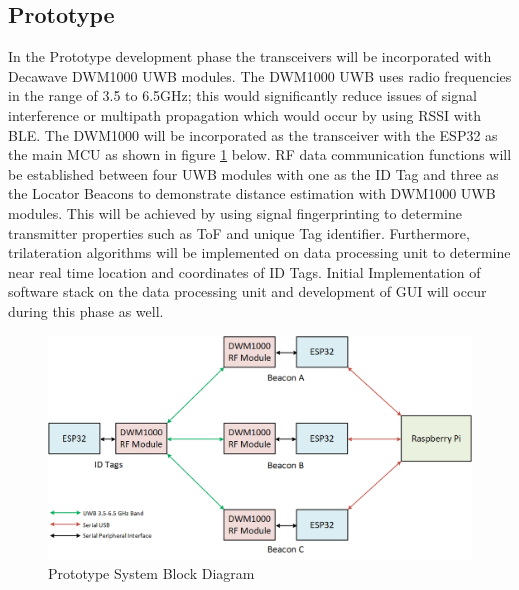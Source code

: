 \pagebreak
\subsection{Prototype}
\medskip
In the Prototype development phase the transceivers will be incorporated with Decawave DWM1000 UWB modules. The DWM1000 UWB uses radio frequencies in the range of 3.5 to 6.5GHz; this would significantly reduce issues of signal interference or multipath propagation which would occur by using RSSI with BLE. The DWM1000 will be incorporated as the transceiver with the ESP32 as the main MCU as shown in figure \ref{prototype} below. RF data communication functions will be established between four UWB modules with one as the ID Tag and three as the Locator Beacons to demonstrate distance estimation with DWM1000 UWB modules. This will be achieved by using signal fingerprinting to determine transmitter properties such as ToF and unique Tag identifier. Furthermore, trilateration algorithms will be implemented on data processing unit to determine near real time location and coordinates of ID Tags. Initial Implementation of software stack on the data processing unit and development of GUI will occur during this phase as well.

\bigskip
\begin{figure}[H]
\centering
    \includegraphics[width=\linewidth]{./images/02_prototype.png}
    \caption{Prototype System Block Diagram}
    \label{prototype}
\end{figure}


\pagebreak

